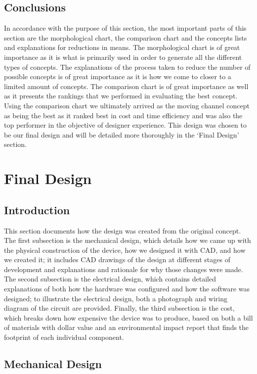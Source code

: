 \documentclass{article}
\begin{document}
\subsection{Conclusions}

In accordance with the purpose of this section, the most important parts of this section are the morphological chart, the comparison chart and the concepts lists and explanations for reductions in means. The morphological chart is of great importance as it is what is primarily used in order to generate all the different types of concepts. The explanations of the process taken to reduce the number of possible concepts is of great importance as it is how we come to closer to a limited amount of concepts. The comparison chart is of great importance as well as it presents the rankings that we performed in evaluating the best concept. Using the comparison chart we ultimately arrived as the moving channel concept as being the best as it ranked best in cost and time efficiency and was also the top performer in the objective of designer experience. This design was chosen to be our final design and will be detailed more thoroughly in the `Final Design' section.


\newpage
\section{Final Design}
\subsection{Introduction}
This section documents how the design was created from the original concept. The first subsection is the mechanical design, which details how we came up with the physical construction of the device, how we designed it with CAD, and how we created it; it includes CAD drawings of the design at different stages of development and explanations and rationale for why those changes were made. The second subsection is the electrical design, which contains detailed explanations of both how the hardware was configured and how the software was designed; to illustrate the electrical design, both a photograph and wiring diagram of the circuit are provided. Finally, the third subsection is the cost, which breaks down how expensive the device was to produce, based on both a bill of materials with dollar value and an environmental impact report that finds the footprint of each individual component.
\subsection{Mechanical Design}
\end{document}

